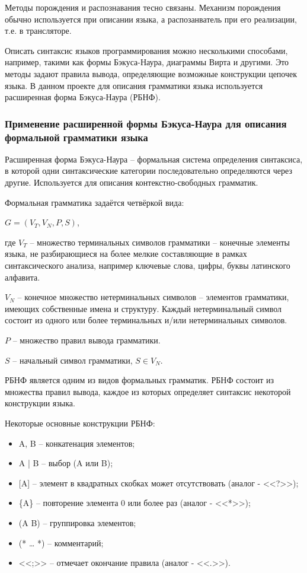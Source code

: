 Методы порождения и распознавания тесно связаны.
Механизм порождения обычно используется при описании языка, а распозанватель при его реализации, т.е. в трансляторе.

Описать синтаксис языков программирования можно несколькими способами, например, такими как формы Бэкуса-Наура, диаграммы Вирта и другими.
Это методы задают правила вывода, определяющие возможные конструкции цепочек языка.
В данном проекте для описания грамматики языка используется расширенная форма Бэкуса-Наура (РБНФ).



\subsubsection{Применение расширенной формы Бэкуса-Наура для описания формальной грамматики языка}

Расширенная форма Бэкуса-Наура – формальная система определения синтаксиса,
в которой одни синтаксические категории последовательно определяются через другие.
Используется для описания контекстно-свободных грамматик.

Формальная грамматика задаётся четвёркой вида:

\(G = (V_T, V_N, P, S)\),

где \(V_T\) -- множество терминальных символов грамматики – конечные
элементы языка, не разбирающиеся на более мелкие составляющие в рамках
синтаксического анализа, например ключевые слова, цифры, буквы
латинского алфавита.

\(V_N\) -- конечное множество нетерминальных символов – элементов грамматики, имеющих собственные имена и структуру.
Каждый нетерминальный символ состоит из одного или более терминальных и/или нетерминальных символов.

\(P\) -- множество правил вывода грамматики.

\(S\) -- начальный символ грамматики, \(S \in V_N\).

РБНФ является одним из видов формальных грамматик.
РБНФ состоит из множества правил вывода, каждое из которых определяет синтаксис некоторой конструкции языка.

Некоторые основные конструкции РБНФ:

\begin{itemize}
    \item A, B -- конкатенация элементов;
    \item A | B -- выбор (A или B);
    \item {[A]} -- элемент в квадратных скобках может отсутствовать (аналог - <<?>>);
    \item \{A\} -- повторение элемента 0 или более раз (аналог - <<*>>);
    \item (A B) -- группировка элементов;
    \item (* … *) – комментарий;
    \item <<;>> – отмечает окончание правила (аналог - <<.>>).
\end{itemize}


